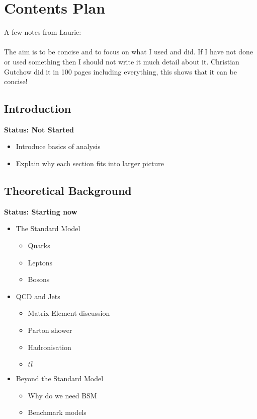 %
%
%
\chapter{Contents Plan}

\noindent
A few notes from Laurie:\\
\indent\\
The aim is to be concise and to focus on what I used and did.
If I have not done or used something then I should not write it much detail about it.
Christian Gutchow did it in 100 pages including everything, this shows that it can be concise!

\section{Introduction}

\textbf{Status: Not Started}

\begin{itemize}
  \item{Introduce basics of analysis}
  \item{Explain why each section fits into larger picture}
\end{itemize}

\section{Theoretical Background}

\textbf{Status: Starting now}

\begin{itemize}
\item{The Standard Model}
  \begin{itemize}[label={$-$}]
  \item{Quarks}
  \item{Leptons}
  \item{Bosons}
  \end{itemize}     
\item{QCD and Jets}
  \begin{itemize}[label={$-$}]
  \item{Matrix Element discussion}
  \item{Parton shower}
  \item{Hadronisation}
  \item{$t\bar{t}$}
  \end{itemize}     
\item{Beyond the Standard Model}
  \begin{itemize}[label={$-$}]
  \item{Why do we need BSM}
  \item{Benchmark models}
  \end{itemize}
\end{itemize}

